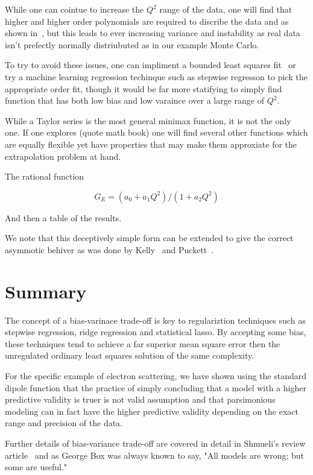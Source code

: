 \documentclass[10pt,aps,prc,twocolumn]{revtex4-1}
\begin{document}
While one can cointue to increase the $Q^2$ range of the data, one will find that higher and higher order polynomials are required
to discribe the data and as shown in~\cite{Kraus:2014qua}, but this leads to ever increasing variance and instability as real data
isn't prefectly normally distriubuted as in our example Monte Carlo.

To try to avoid these issues, one can impliment a bounded least squares fit~\cite{} or try a machine learning regression techinque
such as stepwise regresson to pick the appropriate order fit, though it would be far more statifying to simply find function that has 
both low bias and low varaince over a large range of $Q^2$.

While a Taylor series is the most general minimax function, it is not the only one.    If one explores (quote math book) one 
will find several other functions which are equally flexible yet have properties that may make them approxiate for the 
extrapolation problem at hand.

The rational function

\begin{equation}
G_E = (a_0 + a_1 Q^2)/(1 + a_2 Q^2)
\end{equation}

And then a table of the results.

We note that this deceptively simple form can be extended to give the correct asymmotic behiver
as was done by Kelly~\cite{} and Puckett~\cite{}.

%
%
%
%

\section{Summary}

The concept of a bias-varinace trade-off is key to regulariztion techniques such as stepwise regression, ridge regression and
statistical lasso.    By accepting some bias, these techniques tend to achieve a far superior mean square error then
the unregulated ordinary least squares solution of the same complexity.     

For the specific example of electron scattering, we have shown using the standard dipole function that 
the practice of simply concluding that a model with a higher predictive validity is truer is not valid 
assumption and that parsimonious modeling can in fact have the higher predictive validity depending on 
the exact range and precision of the data.

Further details of bias-variance trade-off are covered in detail in Shmueli's review article~\cite{Shmueli:2010}  
and as George Box was always known to say, "All models are wrong; but some are useful."


\end{document}
